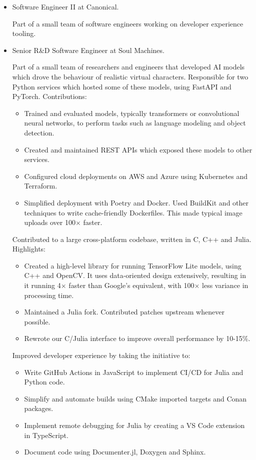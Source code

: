 \documentclass[10pt]{article}
\newcommand\asideformat{\bfseries\color{black!62.5}}
\newcommand\aside[1]{\hfill{\footnotesize\asideformat\raisebox{1pt}{#1}}}
\begin{document}
\begin{itemize}
\item
	Software Engineer II at Canonical. \aside{2024--\phantom{2025}}

	Part of a small team of software engineers working on developer experience tooling.
\item
	Senior R\&D Software Engineer at Soul Machines. \aside{2020--2024}

	Part of a small team of researchers and engineers that developed AI models which drove the behaviour of realistic virtual characters.
	Responsible for two Python services which hosted some of these models, using FastAPI and PyTorch.
	Contributions:
	\begin{itemize}
	\item
		Trained and evaluated models, typically transformers or convolutional neural networks, to perform tasks such as language modeling and object detection.
	\item
		Created and maintained REST APIs which exposed these models to other services.
	\item
		Configured cloud deployments on AWS and Azure using Kubernetes and Terraform.
	\item
		Simplified deployment with Poetry and Docker.
		Used BuildKit and other techniques to write cache-friendly Dockerfiles.
		This made typical image uploads over 100$\times$ faster.
	\end{itemize}

	Contributed to a large cross-platform codebase, written in C, C++ and Julia.
	Highlights:
	\begin{itemize}
	\item
		Created a high-level library for running TensorFlow Lite models, using C++ and OpenCV.
		It uses data-oriented design extensively, resulting in it running 4$\times$ faster than Google's equivalent, with 100$\times$ less variance in processing time.
	\item
		Maintained a Julia fork.
		Contributed patches upstream whenever possible.
	\item
		Rewrote our C/Julia interface to improve overall performance by 10-15$\%$.
	\end{itemize}

	Improved developer experience by taking the initiative to:
	\begin{itemize}
	\item
		Write GitHub Actions in JavaScript to implement CI/CD for Julia and Python code.
	\item
		Simplify and automate builds using CMake imported targets and Conan packages.
	\item
		Implement remote debugging for Julia by creating a VS Code extension in TypeScript.
	\item
		Document code using Documenter.jl, Doxygen and Sphinx.
	\end{itemize}
\end{itemize}
\end{document}
